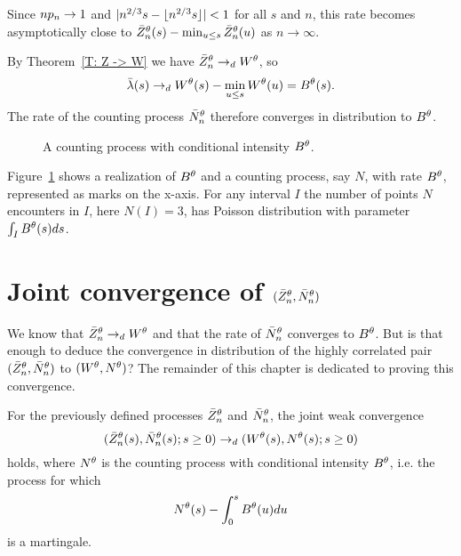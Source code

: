 Since $np_n \rightarrow 1$ and $|n^{2 / 3}s - \lfloor n^{2 / 3}s\rfloor| < 1$ for all $s$ and $n$,
this rate becomes asymptotically close to $\bar{Z}^{\theta}_n(s) - \min_{u \leq s}\bar{Z}^{\theta}_n(u)$ as $n \rightarrow \infty$.

By Theorem~\ref{T: Z -> W} we have $\bar{Z}^{\theta}_n \rightarrow_d W^{\theta}$,
so
\begin{equation}
\bar{\lambda}(s) \rightarrow_d W^{\theta}(s) - \min_{u \leq s}W^{\theta}(u) = B^{\theta}(s).
\end{equation}
The rate of the counting process $\bar{N}_n^{\theta}$ therefore converges in distribution to $B^{\theta}$.

\begin{figure}[ht]
	\centering
	
	\caption{A counting process with conditional intensity $B^{\theta}$.} 
	\label{F: area points}
\end{figure}

Figure~\ref{F: area points} shows a realization of $B^{\theta}$ and a counting process, say $N$, with rate $B^{\theta}$,
represented as marks on the x-axis.
For any interval $I$ the number of points $N$ encounters in $I$, here $N(I) = 3$, 
has Poisson distribution with parameter $\int_{I}B^{\theta}(s)ds$.


\section{Joint convergence of $(\bar{Z}^{\theta}_n, \bar{N}_n^{\theta})$}

We know that $\bar{Z}^{\theta}_n \rightarrow_d W^{\theta}$ and that the rate of $\bar{N}_n^{\theta}$ converges to $B^{\theta}$.
But is that enough to deduce the convergence in distribution of the highly correlated pair $(\bar{Z}^{\theta}_n, \bar{N}_n^{\theta})$ to $(W^{\theta}, N^{\theta})$?
The remainder of this chapter is dedicated to proving this convergence.


\begin{theorem} \label{T: Joint Convergence}
	For the previously defined processes $\bar{Z}^{\theta}_n$ and $\bar{N}_n^{\theta}$,
	the joint weak convergence
	\begin{equation}
	( \bar{Z}^{\theta}_n(s), \bar{N}_n^{\theta}(s); s \geq 0 ) \rightarrow_d (W^{\theta}(s), N^{\theta}(s); s \geq 0)
	\end{equation}
	holds, where $N^{\theta}$ is the counting process with conditional intensity $B^{\theta}$,
	i.e. the process for which
	\begin{equation*}
	N^{\theta}(s) - \int_{0}^s B^{\theta}(u)du
	\end{equation*}
	is a martingale.
\end{theorem}

